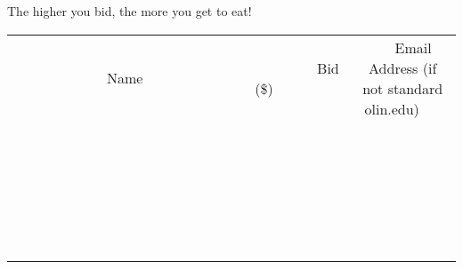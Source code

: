 \documentclass[11pt]{article}
\begin{document}
The higher you bid, the more you get to eat!
\\[6ex]
\begin{tabular}{c c c}
~~~~~~~~~~~~~Name~~~~~~~~~~~~~ & ~~~~~~~~~Bid (\$)~~~~~~~~~  & ~~~Email Address (if not standard olin.edu)~~~\\
 & & \\
\hline
 & & \\
\hline
 & & \\
\hline
 & & \\
\hline
 & & \\
\hline
 & & \\
\hline
 & & \\
\hline
 & & \\
\hline
 & & \\
\hline
 & & \\
\hline
 & & \\
\hline
 & & \\
\hline
 & & \\
\hline
 & & \\
\hline
 & & \\
\hline
 & & \\
\hline
 & & \\
\hline
 & & \\
\hline
 & & \\
\hline
 & & \\
\hline
 & & \\
\hline
 & & \\
\hline
 & & \\
\hline
 & & \\
\hline
 & & \\
\hline
 & & \\
\hline
\end{tabular}
\newpage
\end{document}

